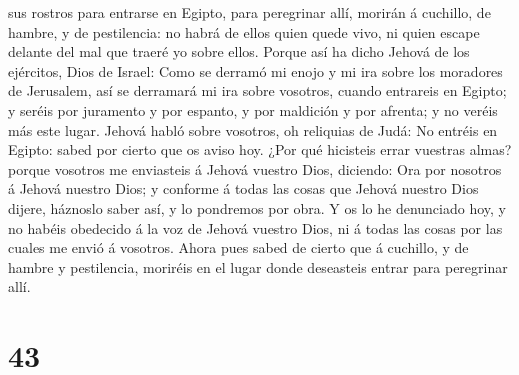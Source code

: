 sus rostros para entrarse en Egipto, para peregrinar allí, morirán á
cuchillo, de hambre, y de pestilencia: no habrá de ellos quien quede
vivo, ni quien escape delante del mal que traeré yo sobre ellos.
 Porque así ha dicho Jehová de los ejércitos, Dios de
Israel: Como se derramó mi enojo y mi ira sobre los moradores de
Jerusalem, así se derramará mi ira sobre vosotros, cuando entrareis en
Egipto; y seréis por juramento y por espanto, y por maldición y por
afrenta; y no veréis más este lugar.  Jehová habló sobre
vosotros, oh reliquias de Judá: No entréis en Egipto: sabed por cierto
que os aviso hoy.  ¿Por qué hicisteis errar vuestras almas?
porque vosotros me enviasteis á Jehová vuestro Dios, diciendo: Ora por
nosotros á Jehová nuestro Dios; y conforme á todas las cosas que Jehová
nuestro Dios dijere, háznoslo saber así, y lo pondremos por obra.
 Y os lo he denunciado hoy, y no habéis obedecido á la voz
de Jehová vuestro Dios, ni á todas las cosas por las cuales me envió á
vosotros.  Ahora pues sabed de cierto que á cuchillo, y de
hambre y pestilencia, moriréis en el lugar donde deseasteis entrar para
peregrinar allí.

\hypertarget{section-42}{%
\section{43}\label{section-42}}

